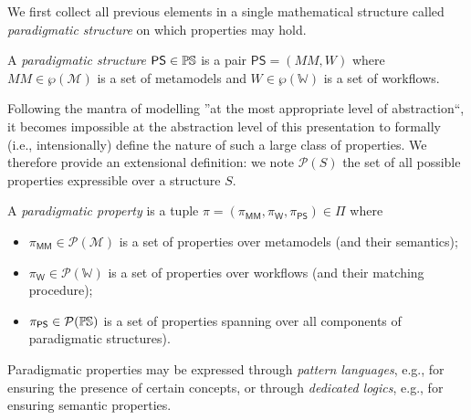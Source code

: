We first collect all previous elements in a single mathematical structure 
called \emph{paradigmatic structure} on which properties may hold.


\begin{Definition}
   A \emph{paradigmatic structure} $\mathsf{PS}\in \mathbb{P}\mskip-1mu\mathbb{S}$ is a pair $\mathsf{PS} 
= (MM, W)$ where $MM\in \wp(\mathcal{M})$ is a set of metamodels and 
$W \in \wp(\mathbb{W})$ is a set of workflows.
\end{Definition}


Following the mantra of modelling ''at the most appropriate 
level of abstraction``, it becomes impossible at the abstraction level of this 
presentation to formally (i.e., intensionally) define the nature of such a 
large class of properties. We therefore provide an extensional definition: we 
note $\mathcal{P}(S)$ the set of all possible properties expressible over a 
structure $S$. 


\begin{Definition}
   A \emph{paradigmatic property} is a tuple
$\pi = (\pi_{\mathsf{MM}},\pi_{\mathsf{W}},\pi_{\mathsf{PS}}) \in \Pi$ where
\begin{itemize}
   \item $\pi_{\mathsf{MM}} \in \mathcal{P}(\mathcal{M})$ is a set of 
properties 
over metamodels (and their semantics);
   \item $\pi_{\mathsf{W}} \in \mathcal{P}(\mathbb{W})$ is a set of properties 
over workflows (and their matching procedure);
   \item $\pi_{\mathsf{PS}}\in\mathcal{P}(\mathbb{P}\mskip-1mu\mathbb{S})$ is a set of 
properties spanning over all components of paradigmatic structures).
\end{itemize}
\end{Definition}
\noindent
Paradigmatic properties may be expressed through \emph{pattern languages}, 
e.g., 
for ensuring the presence of certain concepts, or through \emph{dedicated 
logics}, e.g., for ensuring semantic properties. 

